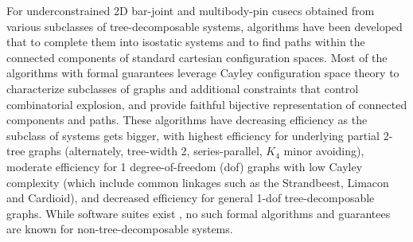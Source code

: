 \medskip\noindent{}
For underconstrained 2D bar-joint and multibody-pin cusecs obtained from
various subclasses of tree-decomposable systems, algorithms have been
developed \cite{XX, XX} that
to complete them into isostatic systems \cite{XX, XX} and to find paths
within the connected components \cite{XX,XX} of
standard cartesian configuration spaces. Most of the algorithms with
formal guarantees leverage Cayley configuration space theory \cite{XX,XX}
to characterize subclasses of graphs and additional constraints that
control combinatorial explosion, and provide faithful bijective
representation
of connected components and paths.
These algorithms have decreasing efficiency as the subclass of systems
gets bigger,  with highest efficiency for
underlying partial 2-tree graphs (alternately, tree-width 2,
series-parallel, $K_4$ minor avoiding),   moderate efficiency for
1 degree-of-freedom (dof) graphs with low Cayley complexity (which include
common linkages such as the Strandbeest, Limacon and Cardioid), and
decreased efficiency for general 1-dof tree-decomposable graphs. While
software suites exist \cite{XX,XX}, no such formal algorithms and
guarantees are known for non-tree-decomposable systems.
%
